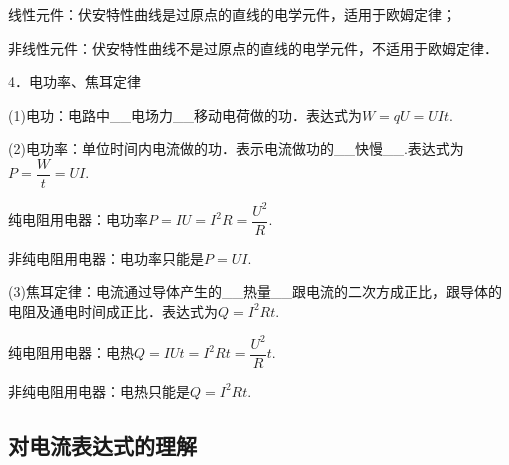 线性元件：伏安特性曲线是过原点的直线的电学元件，适用于欧姆定律；

非线性元件：伏安特性曲线不是过原点的直线的电学元件，不适用于欧姆定律．

4．电功率、焦耳定律

(1)电功：电路中\_\_电场力\_\_移动电荷做的功．表达式为$W=q U=U I t$.

(2)电功率：单位时间内电流做的功．表示电流做功的\_\_快慢\_\_.表达式为$P=\dfrac{W}{t}=UI$.

纯电阻用电器：电功率$P=I U=I^{2} R=\dfrac{U^{2}}{R}$.

非纯电阻用电器：电功率只能是$P=UI$.

(3)焦耳定律：电流通过导体产生的\_\_热量\_\_跟电流的二次方成正比，跟导体的电阻及通电时间成正比．表达式为$Q=I^2Rt$.

纯电阻用电器：电热$Q=I Ut=I^{2} Rt=\dfrac{U^{2}}{R}t$.

非纯电阻用电器：电热只能是$Q=I^2Rt$.


\newpage
\subsection{对电流表达式的理解}


